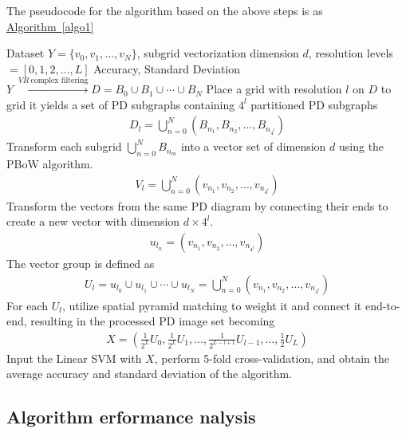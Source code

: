 \documentclass[5GeSdc,ASOC,numref,printGA,printHL,CASflow,nocrossmark,longtitle,PROOF]{/usr/local/texlive/iTemplates/01-Templates/01-Els-Jnl/01-Standard_Templates/V1/ELS_MDL5-V1-6}
\begin{document}
\begin{articlestyle}
The pseudocode for the algorithm based on the above steps is as \hyperref[algo1]{Algorithm~\ref{algo1}}

\begin{algorithm}[tb!]
	\caption{PH-SPBoW Algorithm.}
	\label{algo1}
	\begin{algorithmic}[1]  
		\REQUIRE Dataset $ Y = \{v_0, v_1, \ldots, v_N \} $, subgrid vectorization dimension $ d $, resolution levels $ = [0, 1, 2, \ldots, L] $  
		\ENSURE Accuracy, Standard Deviation  
		\STATE $Y \ \xrightarrow{VR \ \text{complex filtering}} D = B_0 \cup B_1 \cup \cdots \cup B_N$  
		\STATE Place a grid with resolution $ l $ on $ D $ to grid it yields a set of PD subgraphs containing $ 4^l $ partitioned PD subgraphs   
		\begin{align*}  
		D_l = \bigcup_{n=0}^{N}(B_{n_1}, B_{n_2}, \ldots, B_{n_{4^l}})   
		\end{align*}  
		\STATE Transform each subgrid $ \bigcup_{n=0}^{N}B_{n_m} $ into a vector set of dimension $ d $ using the PBoW algorithm.  
		\begin{align*}  
		V_l = \bigcup_{n=0}^{N} (v_{n_1}, v_{n_2}, \ldots, v_{n_{4^l}})   
		\end{align*}  
		\STATE Transform the vectors from the same PD diagram by connecting their ends to create a new vector with dimension $ d \times 4^l $.  
		\begin{align*}  
		u_{l_n} = (v_{n_1}, v_{n_2}, \ldots, v_{n_{4^l}})   
		\end{align*}  
		The vector group is defined as  
		\begin{align*}  
		U_l = u_{l_0} \cup u_{l_1} \cup \cdots \cup u_{l_N} = \bigcup_{n=0}^{N}(v_{n_1}, v_{n_2}, \ldots, v_{n_{4^l}})   
		\end{align*}  
		\ENDFOR 
		\STATE For each $ U_l $, utilize spatial pyramid matching to weight it and connect it end-to-end, resulting in the processed PD image set becoming  
		\begin{align*}  
		X = \left( \frac{1}{2^L} U_0,\frac{1}{2^L} U_1,\ldots, \frac{1}{2^{L-l+1}} U_{l-1}, \ldots, \frac{1}{2} U_L \right)  
		\end{align*}  
		\STATE Input the Linear SVM with $ X $, perform 5-fold cross-validation, and obtain the average accuracy and standard deviation of the algorithm.  
	\end{algorithmic}  
\end{algorithm}

\subsection{Algorithm erformance nalysis}\label{sec3.3}


\end{articlestyle}
\end{document}
